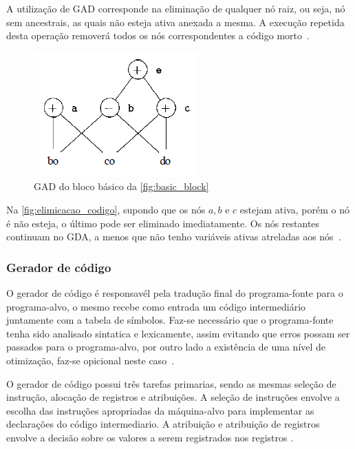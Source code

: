 \par
A utilização de GAD corresponde na eliminação de qualquer nó raiz, ou seja, nó sem ancestrais, as quais não esteja ativa anexada a mesma. A execução repetida desta operação removerá todos os nós correspondentes a código morto~\cite{aho2007compilers}.

\begin{figure}[H]
	\begin{center}
    \caption{\label{fig:elimicacao_codigo}GAD do bloco básico da \autoref{fig:basic_block}}
	\includegraphics[scale=0.70]{Figuras/eliminacao_codigo.png}
	\end{center}
\end{figure}

Na \autoref{fig:elimicacao_codigo}, supondo que os nós $a,b$ e $c$ estejam ativa, porém o nó é não esteja, o último pode ser eliminado imediatamente. Os nós restantes continuam no GDA, a menos que não tenho variáveis ativas atreladas aos nós~\cite{aho2007compilers}.

\subsubsection{Gerador de código}
\par
O gerador de código é responsavél pela tradução final do programa-fonte para o programa-alvo, o mesmo recebe como entrada um código intermediário juntamente com a tabela de símbolos. Faz-se necessário que o programa-fonte tenha sido analisado sintatica e lexicamente, assim evitando que erros possam ser passados para o programa-alvo, por outro lado a existência de uma nível de otimização, faz-se opicional neste caso~\cite{aho2007compilers}.

\par
O gerador de código possui três tarefas primarias, sendo as mesmas seleção de instrução, alocação de registros e atribuições. A seleção de instruções envolve a escolha das instruções apropriadas da máquina-alvo para implementar as declarações do código intermediario. A atribuição e atribuição de registros envolve a decisão sobre os valores a serem registrados nos registros \cite{aho2007compilers}.

